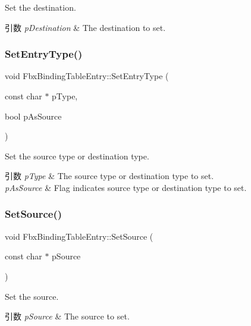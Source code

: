 Set the destination. 
\begin{DoxyParams}{引数}
{\em p\+Destination} & The destination to set. \\
\hline
\end{DoxyParams}
\mbox{\label{class_fbx_binding_table_entry_a9e54bf1bb2bd0bcca05b7b6a057b0b8a}} 
\subsubsection{\texorpdfstring{Set\+Entry\+Type()}{SetEntryType()}}
{\footnotesize\ttfamily void Fbx\+Binding\+Table\+Entry\+::\+Set\+Entry\+Type (\begin{DoxyParamCaption}\item[{const char $\ast$}]{p\+Type,  }\item[{bool}]{p\+As\+Source }\end{DoxyParamCaption})}

Set the source type or destination type. 
\begin{DoxyParams}{引数}
{\em p\+Type} & The source type or destination type to set. \\
\hline
{\em p\+As\+Source} & Flag indicates source type or destination type to set. \\
\hline
\end{DoxyParams}
\mbox{\label{class_fbx_binding_table_entry_abd6159bc2bfa28f28a5b5bd0a5e63c97}} 
\subsubsection{\texorpdfstring{Set\+Source()}{SetSource()}}
{\footnotesize\ttfamily void Fbx\+Binding\+Table\+Entry\+::\+Set\+Source (\begin{DoxyParamCaption}\item[{const char $\ast$}]{p\+Source }\end{DoxyParamCaption})}

Set the source. 
\begin{DoxyParams}{引数}
{\em p\+Source} & The source to set. \\
\hline
\end{DoxyParams}
\mbox{\label{class_fbx_binding_table_entry_aea364cf8ef84414bf9524636e8407498}} 

